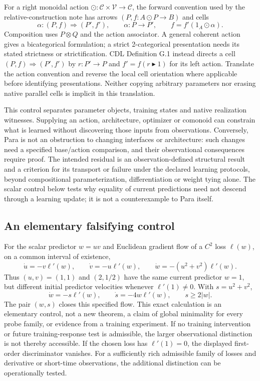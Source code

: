 \documentclass[11pt]{article}
\theoremstyle{remark}
\newcommand{\calC}{\mathcal C}
\begin{document}
For a right monoidal action $\odot:\calC\times\mathcal V\to\calC$, the forward convention used by the relative-construction note has arrows $(P,f:A\odot P\to B)$ and cells
\[
 \alpha:(P,f)\Longrightarrow(P',f'),\qquad
 \alpha:P\to P',\qquad f=f'(1_A\odot\alpha).
\]
Composition uses $P\otimes Q$ and the action associator. A general coherent action gives a bicategorical formulation; a strict 2-categorical presentation needs its stated strictness or strictification. CDL Definition G.1 instead directs a cell $(P,f)\Rightarrow(P',f')$ by $r:P'\to P$ and $f'=f(r\blacktriangleright1)$ for its left action. Translate the action convention and reverse the local cell orientation where applicable before identifying presentations. Neither copying arbitrary parameters nor erasing native parallel cells is implicit in this translation.

This control separates parameter objects, training states and native realization witnesses. Supplying an action, architecture, optimizer or comonoid can constrain what is learned without discovering those inputs from observations. Conversely, Para is not an obstruction to changing interfaces or architecture: such changes need a specified base/action comparison, and their observational consequences require proof. The intended residual is an observation-defined structural result and a criterion for its transport or failure under the declared learning protocols, beyond compositional parameterization, differentiation or weight tying alone. The scalar control below tests why equality of current predictions need not descend through a learning update; it is not a counterexample to Para itself.

\subsection{An elementary falsifying control}

For the scalar predictor $w=uv$ and Euclidean gradient flow of a $C^2$ loss $\ell(w)$, on a common interval of existence,
\[
 \dot u=-v\ell'(w),\qquad \dot v=-u\ell'(w),\qquad
 \dot w=-(u^2+v^2)\ell'(w).
\]
Thus $(u,v)=(1,1)$ and $(2,1/2)$ have the same current predictor $w=1$, but different initial predictor velocities whenever $\ell'(1)\ne0$. With $s=u^2+v^2$,
\[
 \dot w=-s\ell'(w),\qquad \dot s=-4w\ell'(w),\qquad s\ge 2|w|.
\]
The pair $(w,s)$ closes this specified flow. This exact calculation is an elementary control, not a new theorem, a claim of global minimality for every probe family, or evidence from a training experiment. If no training intervention or future training-response test is admissible, the larger observational distinction is not thereby accessible. If the chosen loss has $\ell'(1)=0$, the displayed first-order discriminator vanishes. For a sufficiently rich admissible family of losses and derivative or short-time observations, the additional distinction can be operationally tested.
\end{document}
